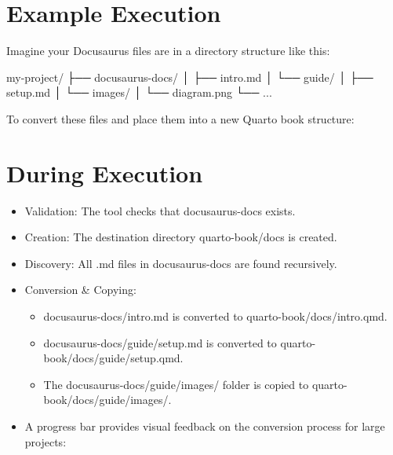 \documentclass[
  letterpaper,
  DIV=11,
  numbers=noendperiod]{scrreprt}
\newenvironment{Shaded}{\begin{snugshade}}{\end{snugshade}}
\newcommand{\AttributeTok}[1]{\textcolor[rgb]{0.40,0.45,0.13}{#1}}
\newcommand{\ExtensionTok}[1]{\textcolor[rgb]{0.00,0.23,0.31}{#1}}
\newcommand{\NormalTok}[1]{\textcolor[rgb]{0.00,0.23,0.31}{#1}}
\newcommand{\OperatorTok}[1]{\textcolor[rgb]{0.37,0.37,0.37}{#1}}
\providecommand{\tightlist}{%
  \setlength{\itemsep}{0pt}\setlength{\parskip}{0pt}}
\begin{document}
\chapter{Example Execution}\label{example-execution}

Imagine your Docusaurus files are in a directory structure like this:

\begin{Shaded}
\begin{Highlighting}[]
\NormalTok{my{-}project/}
\NormalTok{├── docusaurus{-}docs/}
\NormalTok{│   ├── intro.md}
\NormalTok{│   └── guide/}
\NormalTok{│       ├── setup.md}
\NormalTok{│       └── images/}
\NormalTok{│           └── diagram.png}
\NormalTok{└── ...}
\end{Highlighting}
\end{Shaded}

To convert these files and place them into a new Quarto book structure:

\begin{Shaded}
\end{Shaded}

\chapter{During Execution}\label{during-execution}

\begin{itemize}
\tightlist
\item
  Validation: The tool checks that docusaurus-docs exists.
\item
  Creation: The destination directory quarto-book/docs is created.
\item
  Discovery: All .md files in docusaurus-docs are found recursively.
\item
  Conversion \& Copying:

  \begin{itemize}
  \tightlist
  \item
    docusaurus-docs/intro.md is converted to quarto-book/docs/intro.qmd.
  \item
    docusaurus-docs/guide/setup.md is converted to
    quarto-book/docs/guide/setup.qmd.
  \item
    The docusaurus-docs/guide/images/ folder is copied to
    quarto-book/docs/guide/images/.
  \end{itemize}
\item
  A progress bar provides visual feedback on the conversion process for
  large projects:
\end{itemize}
\end{document}

